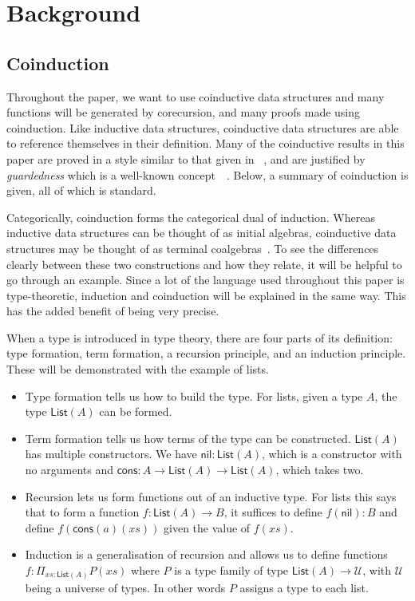 \documentclass[draft]{article}
\theoremstyle{definition} \newtheorem{definition}{Definition}
\theoremstyle{remark} \newtheorem{remark}{Remark}
\begin{document}
\section{Background}\label{sec:background}

\subsection{Coinduction}\label{sec:coinduction}

Throughout the paper, we want to use coinductive data structures and
many functions will be generated by corecursion, and many proofs made
using coinduction. Like inductive data structures, coinductive data
structures are able to reference themselves in their definition. Many
of the coinductive results in this paper are proved in a style similar
to that given in ~\cite{kozen_silva_2017},
and are justified by \emph{guardedness} which is a well-known
concept~\cite{10.1007/3-540-58085-9_72}~\cite{gimenez1995codifying}.
Below, a summary of coinduction is given, all of which is standard.

Categorically, coinduction forms the categorical dual of induction.
Whereas inductive data structures can be thought of as initial
algebras, coinductive data structures may be thought of as terminal
coalgebras~\cite{jacobs1997tutorial}. To see the differences clearly
between these two constructions and how they relate, it will be
helpful to go through an example. Since a lot of the language used
throughout this paper is type-theoretic, induction and coinduction
will be explained in the same way. This has the added benefit of being
very precise.

When a type is introduced in type theory, there are four parts of its
definition: type formation, term formation, a recursion principle, and
an induction principle. These will be demonstrated with the example of
lists.
\begin{itemize}
\item Type formation tells us how to build the type. For lists, given
  a type \(A\), the type \(\mathsf{List}(A)\) can be formed.
\item Term formation tells us how terms of the type can be
  constructed. \(\mathsf{List}(A)\) has multiple constructors. We have
  \(\mathsf{nil} : \mathsf{List}(A)\), which is a constructor with no
  arguments and \(\mathsf{cons} : A \to \mathsf{List}(A) \to
  \mathsf{List}(A)\), which takes two.
\item Recursion lets us form functions out of an inductive type. For
  lists this says that to form a function \(f : \mathsf{List}(A) \to
  B\), it suffices to define \(f(\mathsf{nil}) : B\) and define
  \(f(\mathsf{cons}(a)(xs))\) given the value of \(f(xs)\).
\item Induction is a generalisation of recursion and allows us to
  define functions \(f : \Pi_{xs : \mathsf{List}(A)} P(xs)\) where
  \(P\) is a type family of type \(\mathsf{List}(A) \to \mathcal{U}\),
  with \(\mathcal{U}\) being a universe of types. In other words \(P\)
  assigns a type to each list.
\end{itemize}
\end{document}
